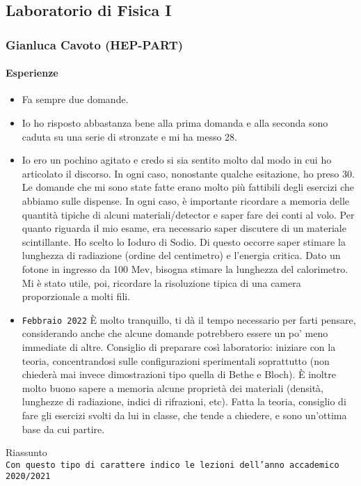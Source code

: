\documentclass[../main.tex]{subfiles}
\begin{document}
\subsection{Laboratorio di Fisica I}
\subsubsection{Gianluca Cavoto (HEP-PART)}
\paragraph{Esperienze}
\begin{itemize}
    \item Fa sempre due domande.
    \item Io ho risposto abbastanza bene alla prima domanda e alla seconda sono caduta su una serie di stronzate e mi ha messo 28.
    \item Io ero un pochino agitato e credo si sia sentito molto dal modo in cui ho articolato il discorso. In ogni caso, nonostante qualche esitazione, ho preso 30. Le domande che mi sono state fatte erano molto più fattibili degli esercizi che abbiamo sulle dispense. In ogni caso, è importante ricordare a memoria delle quantità tipiche di alcuni materiali/detector e saper fare dei conti al volo. Per quanto riguarda il mio esame, era necessario saper discutere di un materiale scintillante. Ho scelto lo Ioduro di Sodio. Di questo occorre saper stimare la lunghezza di radiazione (ordine del centimetro) e l'energia critica. Dato un fotone in ingresso da 100 Mev, bisogna stimare la lunghezza del calorimetro. Mi è stato utile, poi, ricordare la risoluzione tipica di una camera proporzionale a molti fili.
    \item \texttt{Febbraio 2022} È molto tranquillo, ti dà il tempo necessario per farti pensare, considerando anche che alcune domande potrebbero essere un po' meno immediate di altre. Consiglio di preparare così laboratorio: iniziare con la teoria, concentrandosi sulle configurazioni sperimentali soprattutto (non chiederà mai invece dimostrazioni tipo quella di Bethe e Bloch). È inoltre molto buono sapere a memoria alcune proprietà dei materiali (densità, lunghezze di radiazione, indici di rifrazioni, etc). Fatta la teoria, consiglio di fare gli esercizi svolti da lui in classe, che tende a chiedere, e sono un'ottima base da cui partire.
\end{itemize}
Riassunto\\
\texttt{Con questo tipo di carattere indico le lezioni dell'anno accademico 2020/2021}
\end{document}
